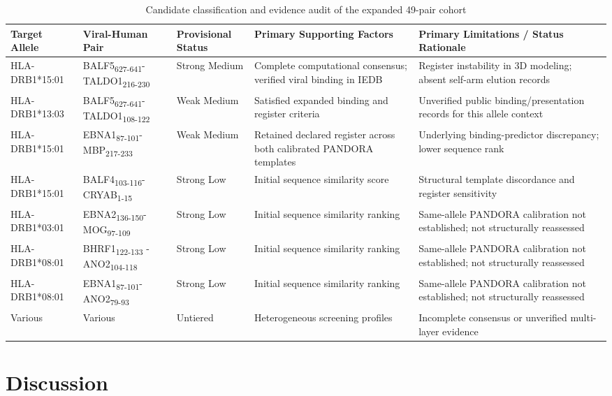\documentclass[11pt]{article}
\begin{document}
\begin{table}[htbp]\centering\footnotesize
\caption{Candidate classification and evidence audit of the expanded 49-pair cohort}
\setlength{\tabcolsep}{3pt}\renewcommand{\arraystretch}{1.25}
\begin{tabular}{p{}p{}p{}p{}p{}}
\toprule
Target Allele & Viral-Human Pair & Provisional Status & Primary Supporting Factors & Primary Limitations / Status Rationale \\
\midrule
HLA-DRB1*15:01 & BALF5\textsubscript{627-641}- TALDO1\textsubscript{216-230} & Strong Medium & Complete computational consensus; verified viral binding in IEDB & Register instability in 3D modeling; absent self-arm elution records \\
HLA-DRB1*13:03 & BALF5\textsubscript{627-641}- TALDO1\textsubscript{108-122} & Weak Medium & Satisfied expanded binding and register criteria & Unverified public binding/presentation records for this allele context \\
HLA-DRB1*15:01 & EBNA1\textsubscript{87-101}- MBP\textsubscript{217-233} & Weak Medium & Retained declared register across both calibrated PANDORA templates & Underlying binding-predictor discrepancy; lower sequence rank \\
HLA-DRB1*15:01 & BALF4\textsubscript{103-116}- CRYAB\textsubscript{1-15} & Strong Low & Initial sequence similarity score & Structural template discordance and register sensitivity \\
HLA-DRB1*03:01 & EBNA2\textsubscript{136-150}- MOG\textsubscript{97-109} & Strong Low & Initial sequence similarity ranking & Same-allele PANDORA calibration not established; not structurally reassessed \\
HLA-DRB1*08:01 & BHRF1\textsubscript{122-133} -ANO2\textsubscript{104-118} & Strong Low & Initial sequence similarity ranking & Same-allele PANDORA calibration not established; not structurally reassessed \\
HLA-DRB1*08:01 & EBNA1\textsubscript{87-101}- ANO2\textsubscript{79-93} & Strong Low & Initial sequence similarity ranking & Same-allele PANDORA calibration not established; not structurally reassessed \\
Various & Various & Untiered & Heterogeneous screening profiles & Incomplete consensus or unverified multi-layer evidence \\
\bottomrule\end{tabular}\end{table}
\FloatBarrier\section{Discussion}
\end{document}
